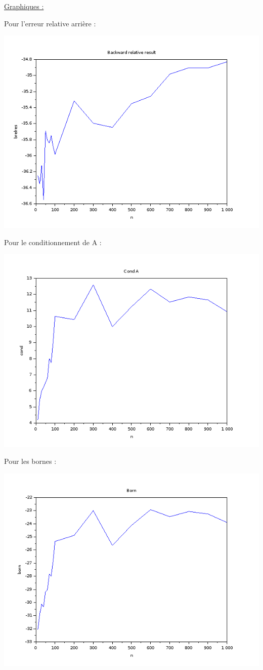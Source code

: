 \documentclass{article}
\begin{document}
\underline{Graphiques :} \newline

Pour l'erreur relative arrière :

\includegraphics[scale=0.5]{img/brelres.png}

Pour le conditionnement de A :

\includegraphics[scale=0.5]{img/capa.png}

Pour les bornes :

\includegraphics[scale=0.5]{img/born.png}
\end{document}
